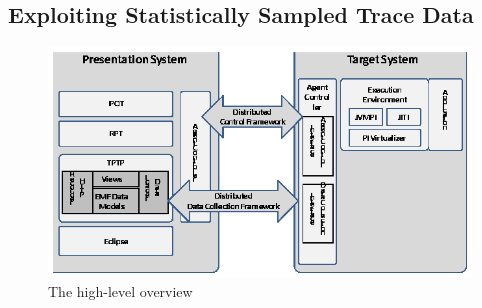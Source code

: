 \subsection{Exploiting Statistically Sampled Trace Data}
\label{sec:statistical}

\begin{figure}[t]
\centering
\includegraphics[scale=0.95,clip]{figs/approach.eps}
\caption{The high-level overview} \label{fig:approach}
\end{figure}

